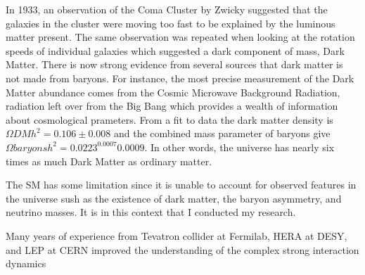In 1933, an observation of the Coma Cluster by Zwicky suggested that the galaxies in the cluster were moving too fast to be explained 
by the luminous matter present. The same observation was repeated when looking at the rotation speeds of individual galaxies which 
suggested a dark component of mass, Dark Matter. There is now strong evidence from several sources that dark matter is not made 
from baryons. 
For instance, the most precise measurement of the Dark Matter abundance comes from the Cosmic Microwave Background Radiation, radiation left over 
from the Big Bang which provides a wealth of information about cosmological prameters.
From a fit to data the dark matter density is $\Omega DM h^2 = 0.106\pm0.008$ and the combined mass parameter of 
baryons give $\Omega baryons h^2 = 0.0223 ^{0.0007}{0.0009}$. In other words, the universe has nearly six times as much Dark 
Matter as ordinary matter.  



The SM has some limitation since it is unable to account for observed features in the universe sush as the existence of dark matter, 
the baryon asymmetry, and neutrino masses. It is in this context that I conducted my research.

Many years of experience from Tevatron collider at Fermilab, HERA at DESY, and LEP at CERN improved the understanding of the 
complex strong interaction dynamics 


